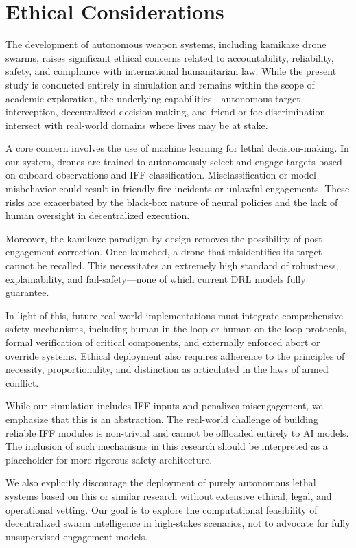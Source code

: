 \section{Ethical Considerations}
    The development of autonomous weapon systems, including kamikaze drone swarms, raises significant ethical concerns related to accountability, reliability, safety, and compliance with international humanitarian law. While the present study is conducted entirely in simulation and remains within the scope of academic exploration, the underlying capabilities—autonomous target interception, decentralized decision-making, and friend-or-foe discrimination—intersect with real-world domains where lives may be at stake.
    \medskip

    A core concern involves the use of machine learning for lethal decision-making. In our system, drones are trained to autonomously select and engage targets based on onboard observations and IFF classification. Misclassification or model misbehavior could result in friendly fire incidents or unlawful engagements. These risks are exacerbated by the black-box nature of neural policies and the lack of human oversight in decentralized execution.
    \medskip

    Moreover, the kamikaze paradigm by design removes the possibility of post-engagement correction. Once launched, a drone that misidentifies its target cannot be recalled. This necessitates an extremely high standard of robustness, explainability, and fail-safety—none of which current DRL models fully guarantee.
    \medskip

    In light of this, future real-world implementations must integrate comprehensive safety mechanisms, including human-in-the-loop or human-on-the-loop protocols, formal verification of critical components, and externally enforced abort or override systems. Ethical deployment also requires adherence to the principles of necessity, proportionality, and distinction as articulated in the laws of armed conflict.
    \medskip

    While our simulation includes IFF inputs and penalizes misengagement, we emphasize that this is an abstraction. The real-world challenge of building reliable IFF modules is non-trivial and cannot be offloaded entirely to AI models. The inclusion of such mechanisms in this research should be interpreted as a placeholder for more rigorous safety architecture.
    \medskip

    We also explicitly discourage the deployment of purely autonomous lethal systems based on this or similar research without extensive ethical, legal, and operational vetting. Our goal is to explore the computational feasibility of decentralized swarm intelligence in high-stakes scenarios, not to advocate for fully unsupervised engagement models.